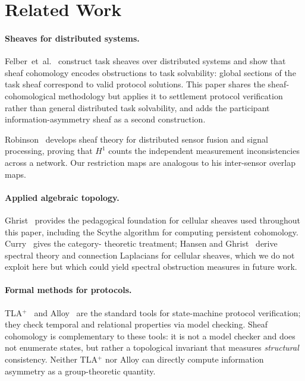 \documentclass[11pt]{article}
\theoremstyle{plain}
\theoremstyle{definition}
\newcommand{\Hone}{H^{1}}
\begin{document}
\section{Related Work}
\label{sec:related}

\paragraph{Sheaves for distributed systems.}
Felber~et~al.~\cite{Felber2025} construct task sheaves over distributed
systems and show that sheaf cohomology encodes obstructions to task
solvability: global sections of the task sheaf correspond to valid protocol
solutions.  This paper shares the sheaf-cohomological methodology but
applies it to settlement protocol verification rather than general
distributed task solvability, and adds the participant
information-asymmetry sheaf as a second construction.

Robinson~\cite{Robinson2014} develops sheaf theory for distributed
sensor fusion and signal processing, proving that $\Hone$ counts the
independent measurement inconsistencies across a network.  Our restriction
maps are analogous to his inter-sensor overlap maps.

\paragraph{Applied algebraic topology.}
Ghrist~\cite{Ghrist2014} provides the pedagogical foundation for cellular
sheaves used throughout this paper, including the Scythe algorithm for
computing persistent cohomology.  Curry~\cite{Curry2014} gives the category-
theoretic treatment; Hansen and Ghrist~\cite{HansenGhrist2019} derive spectral
theory and connection Laplacians for cellular sheaves, which we do not exploit
here but which could yield spectral obstruction measures in future work.

\paragraph{Formal methods for protocols.}
TLA$^+$~\cite{Lamport2002} and Alloy~\cite{Jackson2012} are the standard tools
for state-machine protocol verification; they check temporal and relational
properties via model checking.  Sheaf cohomology is complementary to these
tools: it is not a model checker and does not enumerate states, but rather
a topological invariant that measures \emph{structural} consistency.
Neither TLA$^+$ nor Alloy can directly compute information asymmetry as a
group-theoretic quantity.
\end{document}
